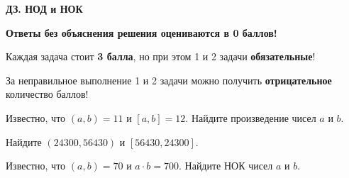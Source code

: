 \centerline{\bf \Huge ДЗ. НОД и НОК}
\centerline{\bf \Huge }

\begin{flushright}
        \scriptsize{\textbf{Ответы без объяснения решения оцениваются в 0 баллов!}}
\end{flushright}

Каждая задача стоит \textbf{3 балла}, но при этом 1 и 2 задачи \textbf{обязательные}! 

За неправильное выполнение 1 и 2 задачи можно получить \textbf{отрицательное} количество баллов!


 Известно, что $(a,b)=11$ и $[a,b]=12$. Найдите произведение чисел $a$ и $b$.

 Найдите $(24300,56430)$ и $[56430,24300]$.

 Известно, что $(a,b)=70$ и $a\cdot b=700$. Найдите НОК чисел $a$ и $b$.


